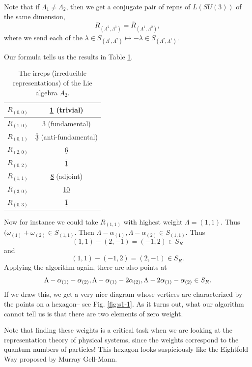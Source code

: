 Note that if $\Lambda_1\neq \Lambda_2$, then we get a conjugate pair of repns of $L(SU(3))$ of the same dimension,
$$R_{(\Lambda^2,\Lambda^1)}=\bar R_{(\Lambda^1,\Lambda^2)},$$
where we send each of the $\lambda \in S_{(\Lambda^1,\Lambda^2)}\mapsto -\lambda \in S_{(\Lambda^2,\Lambda^1)}.$

Our formula tells us the results in Table \ref{tab:a2irreps}.
\begin{table}[]
    \centering
    \begin{tabular}{c|c}
        \\\hline
         $R_{(0,0)}$ & \underline{1} (trivial) \\ \hline
         $R_{(1,0)}$ & \underline{3} (fundamental) \\ \hline
         $R_{(0,1)}$ & $\overline{\underline{3}}$ (anti-fundamental) \\ \hline
         $R_{(2,0)}$ & $\underline{6}$ \\ \hline
         $R_{(0,2)}$ & $\overline{\underline{1}}$ \\ \hline
         $R_{(1,1)}$ & \underline{8} (adjoint) \\ \hline
         $R_{(3,0)}$ & \underline{10} \\ \hline
         $R_{(0,3)}$ & $\overline{\underline{1}}$
    \end{tabular}
    \caption{The irreps (irreducible representations) of the Lie algebra $A_2$.}
    \label{tab:a2irreps}
\end{table}
Now for instance we could take $R_{(1,1)}$ with highest weight $\Lambda=(1,1)$. Thus $(\omega_{(1)}+\omega_{(2)}\in S_{(1,1)}$. Then
$\Lambda-\alpha_{(1)},\Lambda-\alpha_{(2)}\in S_{(1,1)}.$
Thus
$$(1,1)-(2,-1)=(-1,2)\in S_R$$ and $$(1,1)-(-1,2)=(2,-1)\in S_R.$$ Applying the algorithm again, there are also points at
$$\Lambda-\alpha_{(1)}-\alpha_{(2)},\Lambda-\alpha_{(1)}-2\alpha_{(2)},\Lambda-2\alpha_{(1)}-\alpha_{(2)}\in S_R.$$
If we draw this, we get a very nice diagram whose vertices are characterized by the points on a hexagon-- see Fig. \ref{fig:s1-1}. As it turns out, what our algorithm cannot tell us is that there are two elements of zero weight.

Note that finding these weights is a critical task when we are looking at the representation theory of physical systems, since the weights correspond to the quantum numbers of particles! This hexagon looks suspiciously like the Eightfold Way proposed by Murray Gell-Mann.

